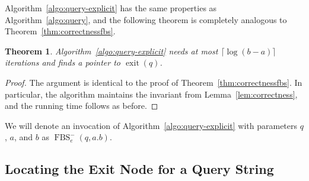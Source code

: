 \documentclass[a4paper,11pt]{article}
\newtheorem{theorem}{Theorem}[section]
\newcommand{\?}{\mskip1.5mu}
\DeclareMathOperator{\exit}{exit}
\DeclareMathOperator{\fbs}{FBS}
\begin{document}
Algorithm~\ref{algo:query-explicit} has
the same properties as Algorithm~\ref{algo:query},
and the following theorem is completely analogous to
Theorem~\ref{thm:correctnessfbs}.

\begin{theorem}
\label{thm:correctnessfbs-explicit}
Algorithm~\ref{algo:query-explicit} needs at most $\lceil\log(b-a)\rceil$
iterations
and finds a pointer to $\exit(q)$.
\end{theorem}

\begin{proof}
The argument is identical to the proof of Theorem~\ref{thm:correctnessfbs}.
In particular, the algorithm maintains the invariant from
Lemma~\ref{lem:correctness}, and the running time 
follows as before.
\end{proof}

We will denote an invocation of Algorithm~\ref{algo:query-explicit}
with parameters $q$, $a$, and $b$ as $\fbs_e^{-}(q, a. b)$.

\subsection{Locating the Exit Node for a Query String}
\end{document}

